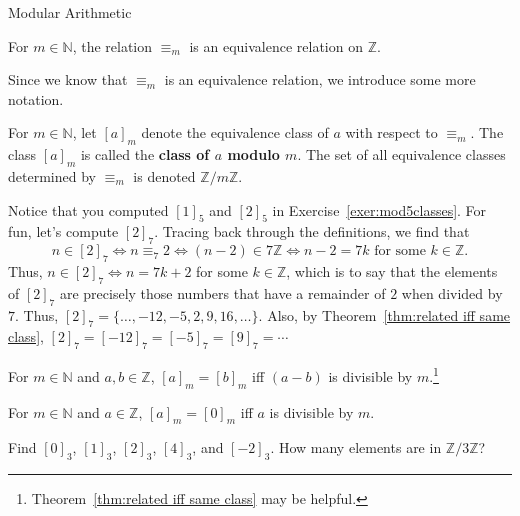 \begin{section}{Modular Arithmetic}
\begin{theorem}
For  $m\in \mathbb{N}$, the relation $\equiv_m$ is an equivalence relation on $\mathbb{Z}$.%
\end{theorem}

Since we know that $\equiv_m$ is an equivalence relation, we introduce some more notation.

\begin{definition}\label{def:modulo}
For  $m\in \mathbb{N}$, let $[a]_m$ denote the equivalence class of $a$ with respect to $\equiv_m$. The class $[a]_m$ is called the \textbf{class of $a$ modulo $m$}. The set of all equivalence classes determined by  $\equiv_m$ is denoted $\mathbb{Z}/m\mathbb{Z}$.
\end{definition}

\begin{example}\label{exam:twomodseven}
Notice that you computed $[1]_5$ and $[2]_5$ in Exercise~\ref{exer:mod5classes}. For fun, let's compute $[2]_7$. 
Tracing back through the definitions, we find that \[n \in [2]_7 \iff n \equiv_7 2 \iff (n-2)\in 7\mathbb{Z} \iff n-2 = 7k \text{ for some $k\in \mathbb{Z}$}.\] Thus, $n \in [2]_7 \iff n = 7k +2$ for some $k\in \mathbb{Z}$, which is to say that the elements of $[2]_7$ are precisely those numbers that have a remainder of $2$ when divided by $7$. Thus, $[2]_7 = \{\ldots,-12,-5,2,9,16,\ldots\}$. Also, by Theorem~\ref{thm:related iff same class}, $[2]_7 = [-12]_7 = [-5]_7 = [9]_7=\cdots$
\end{example}


\begin{theorem}\label{thm.congclassesequal}
For  $m\in \mathbb{N}$ and $a,b\in \mathbb{Z}$, $[a]_m = [b]_m$ iff $(a-b)$ is divisible by $m$.\footnote{Theorem~\ref{thm:related iff same class} may be helpful.} 
\end{theorem}

\begin{theorem}\label{thm.divisibleiffzeromod}
For  $m\in \mathbb{N}$ and $a\in \mathbb{Z}$, $[a]_m = [0]_m$ iff $a$ is divisible by $m$.
\end{theorem}


\begin{exercise}
Find $[0]_3$, $[1]_3$, $[2]_3$, $[4]_3$, and $[-2]_3$. How many elements are in $\mathbb{Z}/3\mathbb{Z}$?
\end{exercise}


\end{section}
